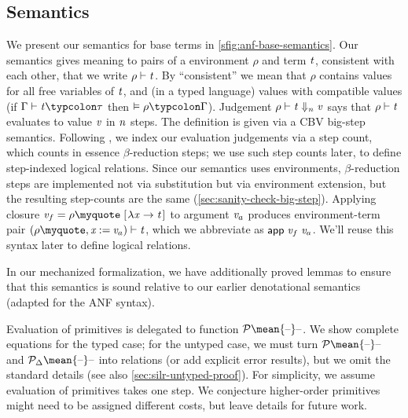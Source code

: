 \subsection{Semantics}
\label{sec:bsos-anf-semantics}
We present our semantics for base terms in \cref{sfig:anf-base-semantics}.
Our semantics gives meaning to pairs of a environment \ensuremath{\rho} and term \ensuremath{\Varid{t}},
consistent with each other, that we write \ensuremath{\rho\vdash\Varid{t}}. By ``consistent'' we mean that
\ensuremath{\rho} contains values for all free variables of \ensuremath{\Varid{t}}, and (in a typed language)
values with compatible values (if \ensuremath{\Gamma\vdash\Varid{t}\typcolon\tau} then \ensuremath{\vDash\rho\typcolon\Gamma}).
Judgement \ensuremath{\rho\vdash\Varid{t}\;\negthickspace\Downarrow_{\Varid{n}}\negthickspace\;\Varid{v}} says that \ensuremath{\rho\vdash\Varid{t}} evaluates to
value \ensuremath{\Varid{v}} in \ensuremath{\Varid{n}} steps. The definition is given via a CBV big-step semantics.
Following \citet*{Acar08}, we index our evaluation judgements via a step count,
which counts in essence $\beta$-reduction steps; we use such step counts later,
to define step-indexed logical relations.
Since our semantics uses environments, $\beta$-reduction steps are implemented
not via substitution but via environment extension, but the resulting
step-counts are the same (\cref{sec:sanity-check-big-step}).
Applying closure \ensuremath{\Varid{v}_f\mathrel{=}\rho\myquote\;[\mskip1.5mu \lambda \Varid{x}\to \Varid{t}\mskip1.5mu]} to argument \ensuremath{\Varid{v}_a} produces environment-term
pair \ensuremath{(\rho\myquote,\Varid{x}\mathbin{:=}\Varid{v}_a)\vdash\Varid{t}}, which we abbreviate as \ensuremath{\mathsf{app}\;\Varid{v}_f\;\Varid{v}_a}. We'll
reuse this syntax later to define logical relations.

In our mechanized formalization, we have additionally proved
lemmas to ensure that this semantics is sound relative to our
earlier denotational semantics (adapted for the ANF syntax).

Evaluation of primitives is delegated to function \ensuremath{\mathcal{P}\mean{\text{\textendash}}\text{\textendash}}. We show
complete equations for the typed case; for the untyped case, we
must turn \ensuremath{\mathcal{P}\mean{\text{\textendash}}\text{\textendash}} and \ensuremath{\mathcal{P}_{\Delta}\mean{\text{\textendash}}\text{\textendash}} into relations (or add explicit error
results), but we omit the standard details (see also
\cref{sec:silr-untyped-proof}).
For simplicity, we assume evaluation of primitives takes one step.
We conjecture higher-order primitives might need to be assigned
different costs, but leave details for future work.

